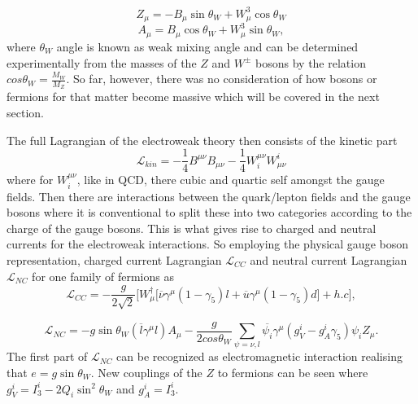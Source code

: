 \begin{equation}
	Z_{\mu}=-B_{\mu}\sin\theta_{W}+W^{3}_{\mu}\cos\theta_{W}
\end{equation}
\begin{equation}
	A_{\mu}= B_{\mu}\cos\theta_{W}+W^{3}_{\mu}\sin\theta_{W},
\end{equation}
where \DIFaddbegin {}\DIFaddend $\theta_{W}$ angle is known as \DIFaddbegin {}\DIFaddend weak mixing angle and can be determined experimentally from the masses of the $Z$ and $W^{\pm}$ bosons by the relation
$cos\theta_{W} = \frac{M_{W}}{M_{Z}}$. So far, however, there was no consideration of how bosons or fermions for that matter become massive which will be covered in the next section.

The full Lagrangian of the electroweak theory then consists of the kinetic part
\begin{equation}
\mathcal{L}_{kin}=  -\frac{1}{4} B^{\mu\nu}B_{\mu\nu} -\frac{1}{4} W_{i}^{\mu\nu}W^{i}_{\mu\nu}
\end{equation}
where for $W_{i}^{\mu\nu}$, like in \gls{QCD}, there \DIFdelbegin {}\DIFdelend \DIFaddbegin {}\DIFaddend cubic and quartic self \DIFdelbegin {}\DIFdelend \DIFaddbegin {}\DIFaddend amongst the gauge fields. Then there are interactions between the quark/lepton fields and the gauge bosons where it is conventional to split these into two categories according to the charge of the gauge bosons.
This is what gives rise to charged and neutral currents for the electroweak interactions. So employing the physical gauge boson representation, \DIFaddbegin {}\DIFaddend charged current Lagrangian $\mathcal{L}_{CC}$ and neutral current Lagrangian $\mathcal{L}_{NC}$ for one family of fermions \DIFdelbegin {}\DIFdelend \DIFaddbegin {}\DIFaddend as
\begin{equation}
	\mathcal{L}_{CC}= - \frac{g}{2\sqrt{2}}\Big[W_{\mu}^{\dagger}\big[\overline{\nu}\gamma^{\mu}(1-\gamma_{5})l + \overline{u}\gamma^{\mu}(1-\gamma_{5})d\big] + h.c\Big], 
\label{eq:LC}
\end{equation}

\begin{equation}
	\mathcal{L}_{NC}= - g \sin\theta_{W}(\overline{l}\gamma^{\mu}l)A_{\mu} - \frac{g}{2cos\theta_{W}}\sum_{\psi=\nu,l} \overline{\psi_{i}}\gamma^{\mu}(g^{i}_{V} - g^{i}_{A}\gamma_{5})\psi_{i}Z_{\mu}.
\label{eq:NC}
\end{equation}
The first part of $\mathcal{L}_{NC}$ can be recognized as \DIFaddbegin {}\DIFaddend electromagnetic interaction realising that $e=g\sin\theta_{W}$. New couplings of the $Z$ to fermions can be seen where $g^{i}_{V}=I^{i}_{3}-2Q_{i}\sin^{2}\theta_{W}$ and $g^{i}_{A}=I^{i}_{3}$.

